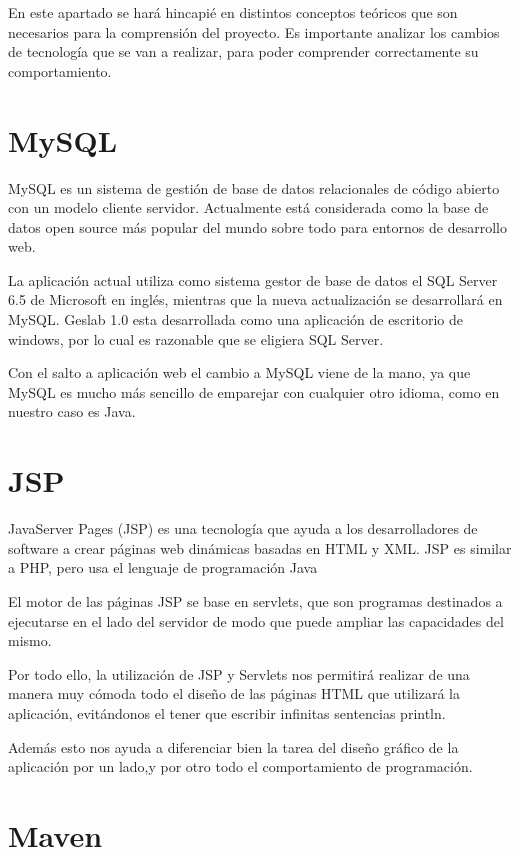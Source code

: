 
En este apartado se hará hincapié en distintos conceptos teóricos que son necesarios para la comprensión del proyecto. Es importante analizar los cambios de tecnología que se van a realizar, para poder comprender correctamente su comportamiento. 

\section{MySQL}

MySQL es un sistema de gestión de base de datos relacionales de código abierto con un modelo cliente servidor. Actualmente está considerada como la base de datos open source más popular del mundo sobre todo para entornos de desarrollo web.

La aplicación actual utiliza como sistema gestor de base de datos el SQL Server 6.5 de Microsoft en inglés, mientras que la  nueva actualización se desarrollará en MySQL. Geslab 1.0 esta desarrollada como una aplicación de escritorio de windows, por lo cual es razonable que se eligiera SQL Server.

Con el salto a aplicación web el cambio a MySQL viene de la mano, ya que MySQL es mucho más sencillo de emparejar con cualquier otro idioma, como en nuestro caso es Java.


\section{JSP}

JavaServer Pages (JSP) es una tecnología que ayuda a los desarrolladores de software a crear páginas web dinámicas basadas en HTML y XML. JSP es similar a PHP, pero usa el lenguaje de programación Java \cite{wiki:JSP}

El motor de las páginas JSP se base en servlets, que son programas destinados a ejecutarse en el lado del servidor de modo que puede ampliar las capacidades del mismo.

Por todo ello, la utilización de JSP y Servlets nos permitirá realizar de una manera muy cómoda todo el diseño de las páginas HTML que utilizará la aplicación, evitándonos el tener que escribir infinitas sentencias println. 

Además esto nos ayuda a diferenciar bien la tarea del diseño gráfico de la aplicación por un lado,y por otro todo el comportamiento de programación.

\section{Maven} 

